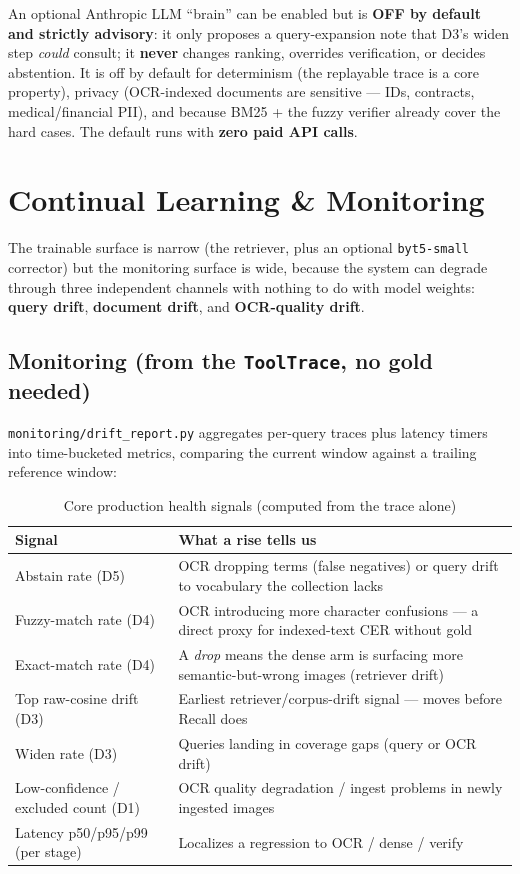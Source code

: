 \documentclass[12pt,a4paper]{article}
\begin{document}
An optional Anthropic LLM ``brain'' can be enabled but is \textbf{OFF by default and strictly advisory}: it only proposes a query-expansion note that D3's widen step \emph{could} consult; it \textbf{never} changes ranking, overrides verification, or decides abstention. It is off by default for determinism (the replayable trace is a core property), privacy (OCR-indexed documents are sensitive --- IDs, contracts, medical/financial PII), and because BM25 + the fuzzy verifier already cover the hard cases. The default runs with \textbf{zero paid API calls}.

\section{Continual Learning \& Monitoring}

The trainable surface is narrow (the retriever, plus an optional \texttt{byt5-small} corrector) but the monitoring surface is wide, because the system can degrade through three independent channels with nothing to do with model weights: \textbf{query drift}, \textbf{document drift}, and \textbf{OCR-quality drift}.

\subsection{Monitoring (from the \texttt{ToolTrace}, no gold needed)}

\texttt{monitoring/drift\_report.py} aggregates per-query traces plus latency timers into time-bucketed metrics, comparing the current window against a trailing reference window:

\begin{table}[H]
\centering
\caption{Core production health signals (computed from the trace alone)}
\small
\begin{tabularx}{\linewidth}{@{} l L @{}}
\toprule
\textbf{Signal} & \textbf{What a rise tells us} \\
\midrule
Abstain rate (D5) & OCR dropping terms (false negatives) or query drift to vocabulary the collection lacks \\
Fuzzy-match rate (D4) & OCR introducing more character confusions --- a direct proxy for indexed-text CER without gold \\
Exact-match rate (D4) & A \emph{drop} means the dense arm is surfacing more semantic-but-wrong images (retriever drift) \\
Top raw-cosine drift (D3) & Earliest retriever/corpus-drift signal --- moves before Recall does \\
Widen rate (D3) & Queries landing in coverage gaps (query or OCR drift) \\
Low-confidence / excluded count (D1) & OCR quality degradation / ingest problems in newly ingested images \\
Latency p50/p95/p99 (per stage) & Localizes a regression to OCR / dense / verify \\
\bottomrule
\end{tabularx}
\end{table}
\end{document}
